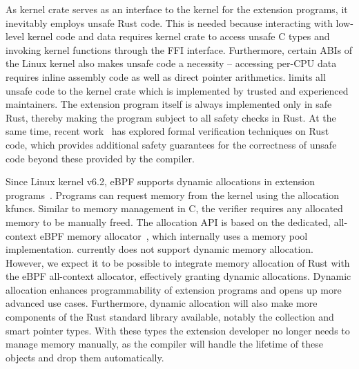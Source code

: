 As \projname{} kernel crate serves as an interface to the kernel for the
    extension programs, it inevitably employs unsafe Rust code.
This is needed because interacting with low-level kernel code and data requires
    kernel crate to access unsafe C types and invoking kernel functions through
    the FFI interface.
Furthermore, certain ABIs of the Linux kernel also makes unsafe code a
    necessity -- accessing per-CPU data requires inline assembly code as well
    as direct pointer arithmetics.
\projname{} limits all unsafe code to the kernel crate which is implemented by
    trusted and experienced maintainers.
The extension program itself is always implemented only in safe Rust, thereby
    making the program subject to all safety checks in Rust.
At the same time, recent work~\cite{verus} has explored formal verification
    techniques on Rust code, which provides additional safety guarantees
    for the correctness of unsafe code beyond these provided by the compiler.

Since Linux kernel v6.2, eBPF supports dynamic allocations in extension
    programs~\cite{Dwivedi-958cf2e273f0}.
Programs can request memory from the kernel using the allocation kfuncs.
Similar to memory management in C, the verifier requires any allocated memory
    to be manually freed.
The allocation API is based on the dedicated, all-context eBPF memory
    allocator~\cite{bpf-mempool-lwn}, which internally uses a memory pool
    implementation.
\projname{} currently does not support dynamic memory allocation.
However, we expect it to be possible to integrate memory allocation of Rust
    with the eBPF all-context allocator, effectively granting \projname{}
    dynamic allocations.
Dynamic allocation enhances programmability of extension programs and opens
    up more advanced use cases.
Furthermore, dynamic allocation will also make more components of the Rust
    standard library available, notably the collection and smart pointer types.
With these types the extension developer no longer needs to manage memory
    manually, as the compiler will handle the lifetime of these objects and
    drop them automatically.

